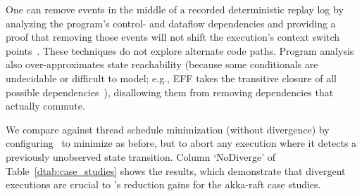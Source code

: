 %
%
%
 One can remove events in the middle of a recorded deterministic
replay log by analyzing the program's control- and
dataflow dependencies and providing a proof that removing those events will not shift the
execution's context switch points~\cite{Lee:2011:TGR:1993498.1993528,tallam2007enabling,huang2012lean,cai2013lock,elyasov2013guided,wang2015fast}.
These techniques do not explore alternate code paths. Program analysis also
over-approximates
state reachability (because some conditionals are undecidable or difficult to
model; e.g., EFF takes the transitive closure of all possible
dependencies~\cite{Lee:2011:TGR:1993498.1993528}), disallowing them from removing dependencies that actually commute.

We compare against thread schedule minimization (without divergence) by configuring \sys~to minimize as before,
but to abort any execution
where it detects a previously unobserved state transition. Column `NoDiverge'
of Table~\ref{dtab:case_studies} shows the results, which demonstrate that
divergent executions are crucial to \sys's reduction gains for the akka-raft case studies.

